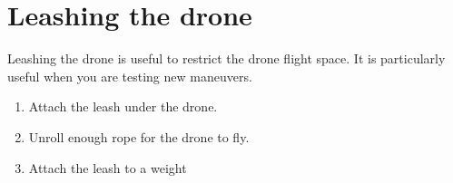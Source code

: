 \section{Leashing the drone}
Leashing the drone is useful to restrict the drone flight space. It is particularly useful when you are testing new maneuvers.
\begin{enumerate}
    \item Attach the leash under the drone.
    \item Unroll enough rope for the drone to fly.
    \item Attach the leash to a weight
\end{enumerate}
